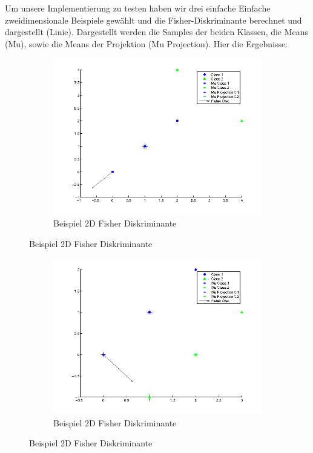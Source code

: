 \documentclass{article}
\begin{document}
	Um unsere Implementierung zu testen haben wir drei einfache Einfache zweidimensionale Beispiele gewählt und die Fisher-Diskriminante berechnet und dargestellt (Linie). Dargestellt werden die Samples der beiden Klassen, die Means (Mu), sowie die Means der Projektion (Mu Projection). Hier die Ergebnisse:
	\begin{figure}[H]
	  \begin{subfigure}
	    \centering
	    \includegraphics[scale=0.8,bb=0 0 576 432]{fisher1.png}
		\caption{Beispiel 2D Fisher Diskriminante}
	  \end{subfigure}
	\end{figure}
	\begin{figure}[H]
	  \begin{subfigure}
	    \centering
	    \includegraphics[scale=0.8,bb=0 0 576 432]{fisher2.png}
		\caption{Beispiel 2D Fisher Diskriminante}
	  \end{subfigure}
	\end{figure}
\end{document}
